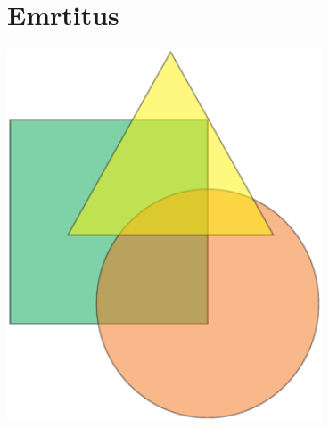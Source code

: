 \section*{Emrtitus}
 
 \begin{minipage}[t]{\textwidth}
	\begingroup
	\parfillskip=0pt
	
  	\begin{minipage}[c]{0.25\textwidth}	
   		\centering
		\includegraphics[width=0.7\textwidth]{Bilder/Grafik}		
  	\end{minipage}	
 	\hfill 	
  	\begin{minipage}[t]{0.7\textwidth}
  		\blindtext
  	\end{minipage}  
	\par\endgroup
\end{minipage}



